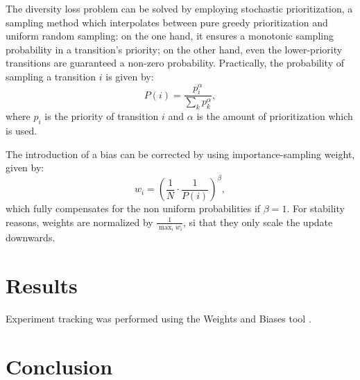 \documentclass[a4paper, 12pt]{article}
\numberwithin{equation}{section}
\begin{document}
The diversity loss problem can be solved by employing stochastic prioritization, a sampling method which interpolates between pure greedy prioritization and uniform random sampling: on the one hand, it ensures a monotonic sampling probability in a transition's priority; on the other hand, even the lower-priority transitions are guaranteed a non-zero probability. Practically, the probability of sampling a transition $i$ is given by:
\begin{equation}
	P\left(i\right)=\frac{p_i^\alpha}{\sum_kp_k^\alpha},
\end{equation}
where $p_i$ is the priority of transition $i$ and $\alpha$ is the amount of prioritization which is used.

The introduction of a bias can be corrected by using importance-sampling weight, given by:
\begin{equation}
	w_i=\left(\frac{1}{N}\cdot\frac{1}{P\left(i\right)}\right)^\beta,
\end{equation}
which fully compensates for the non uniform probabilities if $\beta=1$. For stability reasons, weights are normalized by $\frac{1}{\max_iw_i}$, si that they only scale the update downwards.



\section{Results}

Experiment tracking was performed using the Weights and Biases tool \cite{wandb}.


\section{Conclusion}




















\clearpage
\printbibliography[heading=bibintoc]
\end{document}
